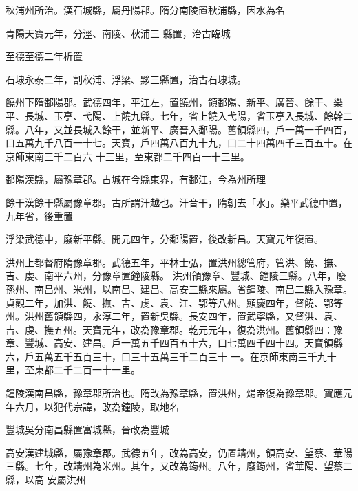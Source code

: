 \begin{pinyinscope}
 秋浦州所治。漢石城縣，屬丹陽郡。隋分南陵置秋浦縣，因水為名



 青陽天寶元年，分涇、南陵、秋浦三
 縣置，治古臨城



 至德至德二年析置



 石埭永泰二年，割秋浦、浮梁、黟三縣置，治古石埭城。



 饒州下隋鄱陽郡。武德四年，平江左，置饒州，領鄱陽、新平、廣晉、餘干、樂平、長城、玉亭、弋陽、上饒九縣。七年，省上饒入弋陽，省玉亭入長城、餘幹二縣。八年，又並長城入餘干，並新平、廣晉入鄱陽。舊領縣四，戶一萬一千四百，口五萬九千八百一十七。天寶，戶四萬八百九十九，口二十四萬四千三百五十。在京師東南三千二百六
 十三里，至東都二千四百一十三里。



 鄱陽漢縣，屬豫章郡。古城在今縣東界，有鄱江，今為州所理



 餘干漢餘干縣屬豫章郡。古所謂汗越也。汗音干，隋朝去「水」。樂平武德中置，九年省，後重置



 浮梁武德中，廢新平縣。開元四年，分鄱陽置，後改新昌。天寶元年復置。



 洪州上都督府隋豫章郡。武德五年，平林士弘，置洪州總管府，管洪、饒、撫、吉、虔、南平六州，分豫章置鐘陵縣。
 洪州領豫章、豐城、鐘陵三縣。八年，廢孫州、南昌州、米州，以南昌、建昌、高安三縣來屬。省鐘陵、南昌二縣入豫章。貞觀二年，加洪、饒、撫、吉、虔、袁、江、鄂等八州。顯慶四年，督饒、鄂等州。洪州舊領縣四，永淳二年，置新吳縣。長安四年，置武寧縣，又督洪、袁、吉、虔、撫五州。天寶元年，改為豫章郡。乾元元年，復為洪州。舊領縣四：豫章、豐城、高安、建昌。戶一萬五千四百五十六，口七萬四千四十四。天寶領縣六，戶五萬五千五百三十，口三十五萬三千二百三十
 一。在京師東南三千九十里，至東都二千二百一十一里。



 鐘陵漢南昌縣，豫章郡所治也。隋改為豫章縣，置洪州，煬帝復為豫章郡。寶應元年六月，以犯代宗諱，改為鐘陵，取地名



 豐城吳分南昌縣置富城縣，晉改為豐城



 高安漢建城縣，屬豫章郡。武德五年，改為高安，仍置靖州，領高安、望蔡、華陽三縣。七年，改靖州為米州。其年，又改為筠州。八年，廢筠州，省華陽、望蔡二縣，以高
 安屬洪州




\end{pinyinscope}

